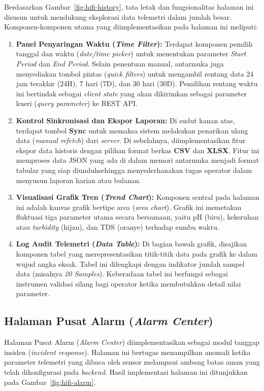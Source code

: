 Berdasarkan Gambar~\ref{fig:hifi-history}, tata letak dan fungsionalitas halaman ini disusun untuk mendukung 
eksplorasi data telemetri dalam jumlah besar. Komponen-komponen utama yang diimplementasikan pada halaman ini meliputi:
\begin{enumerate}
    \item \textbf{Panel Penyaringan Waktu (\textit{Time Filter}):} 
    Terdapat komponen pemilih tanggal dan waktu (\textit{date/time picker}) untuk menentukan parameter \textit{Start Period} 
    dan \textit{End Period}. Selain penentuan manual, antarmuka juga menyediakan tombol pintas 
    (\textit{quick filters}) untuk mengambil rentang data 24 jam terakhir (24H), 7 hari (7D), dan 30 hari (30D). 
    Pemilihan rentang waktu ini bertindak sebagai \textit{client state} yang akan dikirimkan sebagai parameter kueri 
    (\textit{query parameter}) ke REST API.

    \item \textbf{Kontrol Sinkronisasi dan Ekspor Laporan:} 
    Di sudut kanan atas, terdapat tombol \textbf{Sync} untuk memaksa sistem melakukan penarikan ulang data 
    (\textit{manual refetch}) dari \textit{server}. Di sebelahnya, diimplementasikan fitur ekspor data historis 
    dengan pilihan format berkas \textbf{CSV} dan \textbf{XLSX}. Fitur ini memproses data JSON yang ada di 
    dalam memori antarmuka menjadi format tabular yang siap diunduhsehingga menyederhanakan tugas operator dalam 
    menyusun laporan harian atau bulanan.

    \item \textbf{Visualisasi Grafik Tren (\textit{Trend Chart}):} 
    Komponen sentral pada halaman ini adalah kanvas grafik bertipe area (\textit{area chart}). 
    Grafik ini memetakan fluktuasi tiga parameter utama secara bersamaan, yaitu pH (biru), kekeruhan 
    atau \textit{turbidity} (hijau), dan TDS (oranye) terhadap sumbu waktu. 

    \item \textbf{Log Audit Telemetri (\textit{Data Table}):} 
    Di bagian bawah grafik, disajikan komponen tabel yang merepresentasikan titik-titik data pada grafik ke dalam wujud 
    angka eksak. Tabel ini dilengkapi dengan indikator jumlah sampel data (misalnya \textit{20 Samples}). 
    Keberadaan tabel ini berfungsi sebagai instrumen validasi silang bagi operator ketika membutuhkan detail nilai parameter.
\end{enumerate}

\subsection{Halaman Pusat Alarm (\textit{Alarm Center})}
Halaman Pusat Alarm (\textit{Alarm Center}) diimplementasikan sebagai modul tanggap insiden (\textit{incident response}). 
Halaman ini bertugas menampilkan anomali ketika parameter telemetri yang dibaca oleh sensor melampaui ambang 
batas aman yang telah dikonfigurasi pada \textit{backend}. Hasil implementasi halaman ini ditunjukkan pada Gambar~\ref{fig:hifi-alarm}.

